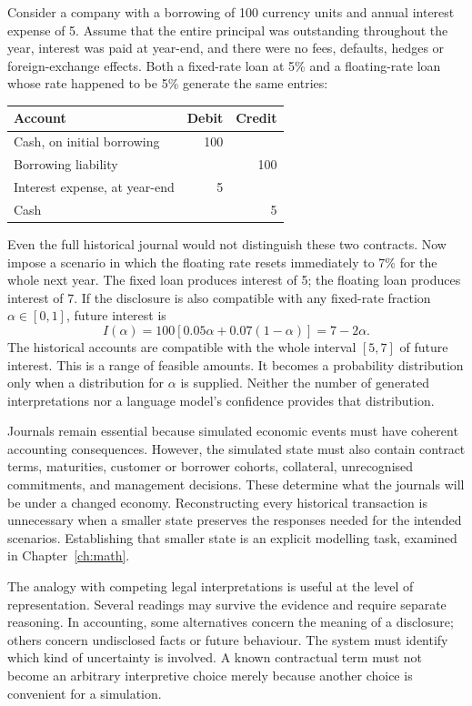Consider a company with a borrowing of 100 currency units and annual interest
expense of 5. Assume that the entire principal was outstanding throughout the
year, interest was paid at year-end, and there were no fees, defaults, hedges or
foreign-exchange effects. Both a fixed-rate loan at 5\% and a floating-rate loan
whose rate happened to be 5\% generate the same entries:
\begin{center}
\begin{tabular}{lrr}
\toprule Account & Debit & Credit\\\midrule
Cash, on initial borrowing &100&\\
Borrowing liability &&100\\\midrule
Interest expense, at year-end &5&\\
Cash &&5\\\bottomrule
\end{tabular}
\end{center}
Even the full historical journal would not distinguish these two contracts.
Now impose a scenario in which the floating rate resets immediately to 7\%
for the whole next year. The fixed loan produces interest of 5; the floating
loan produces interest of 7. If the disclosure is also compatible with any
fixed-rate fraction $\alpha\in[0,1]$, future interest is
\begin{equation}\label{eq:running}
 I(\alpha)=100[0.05\alpha+0.07(1-\alpha)]=7-2\alpha.
\end{equation}
The historical accounts are compatible with the whole interval $[5,7]$ of
future interest. This is a range of feasible amounts. It becomes a probability
distribution only when a distribution for $\alpha$ is supplied. Neither the
number of generated interpretations nor a language model's confidence provides
that distribution.

Journals remain essential because simulated economic events must have coherent
accounting consequences. However, the simulated state must also contain
contract terms, maturities, customer or borrower cohorts, collateral,
unrecognised commitments, and management decisions. These determine what the
journals will be under a changed economy. Reconstructing every historical
transaction is unnecessary when a smaller state preserves the responses needed
for the intended scenarios. Establishing that smaller state is an explicit
modelling task, examined in Chapter~\ref{ch:math}.

The analogy with competing legal interpretations is useful at the level of
representation. Several readings may survive the evidence and require separate
reasoning. In accounting, some alternatives concern the meaning of a disclosure;
others concern undisclosed facts or future behaviour. The system must identify
which kind of uncertainty is involved. A known contractual term must not become
an arbitrary interpretive choice merely because another choice is convenient
for a simulation.

